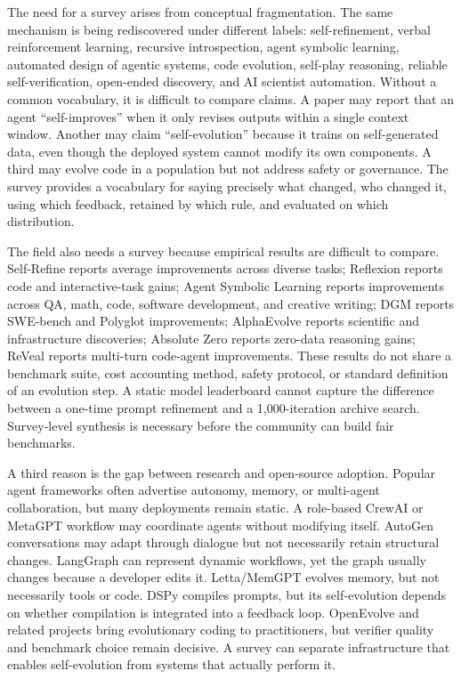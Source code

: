 The need for a survey arises from conceptual fragmentation. The same mechanism is being rediscovered under different labels: self-refinement, verbal reinforcement learning, recursive introspection, agent symbolic learning, automated design of agentic systems, code evolution, self-play reasoning, reliable self-verification, open-ended discovery, and AI scientist automation. Without a common vocabulary, it is difficult to compare claims. A paper may report that an agent ``self-improves'' when it only revises outputs within a single context window. Another may claim ``self-evolution'' because it trains on self-generated data, even though the deployed system cannot modify its own components. A third may evolve code in a population but not address safety or governance. The survey provides a vocabulary for saying precisely what changed, who changed it, using which feedback, retained by which rule, and evaluated on which distribution.

The field also needs a survey because empirical results are difficult to compare. Self-Refine reports average improvements across diverse tasks; Reflexion reports code and interactive-task gains; Agent Symbolic Learning reports improvements across QA, math, code, software development, and creative writing; DGM reports SWE-bench and Polyglot improvements; AlphaEvolve reports scientific and infrastructure discoveries; Absolute Zero reports zero-data reasoning gains; ReVeal reports multi-turn code-agent improvements. These results do not share a benchmark suite, cost accounting method, safety protocol, or standard definition of an evolution step. A static model leaderboard cannot capture the difference between a one-time prompt refinement and a 1,000-iteration archive search. Survey-level synthesis is necessary before the community can build fair benchmarks.

A third reason is the gap between research and open-source adoption. Popular agent frameworks often advertise autonomy, memory, or multi-agent collaboration, but many deployments remain static. A role-based CrewAI or MetaGPT workflow may coordinate agents without modifying itself. AutoGen conversations may adapt through dialogue but not necessarily retain structural changes. LangGraph can represent dynamic workflows, yet the graph usually changes because a developer edits it. Letta/MemGPT evolves memory, but not necessarily tools or code. DSPy compiles prompts, but its self-evolution depends on whether compilation is integrated into a feedback loop. OpenEvolve and related projects bring evolutionary coding to practitioners, but verifier quality and benchmark choice remain decisive. A survey can separate infrastructure that enables self-evolution from systems that actually perform it.

